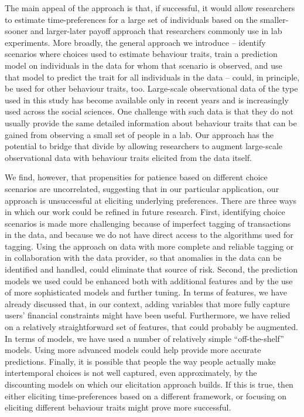 The main appeal of the approach is that, if successful, it would allow
researchers to estimate time-preferences for a large set of individuals based
on the smaller-sooner and larger-later payoff approach that researchers
commonly use in lab experiments. More broadly, the general approach we
introduce -- identify scenarios where choices used to estimate behaviour
traits, train a prediction model on individuals in the data for whom that
scenario is observed, and use that model to predict the trait for all
individuals in the data -- could, in principle, be used for other behaviour
traits, too. Large-scale observational data of the type used in this study has
become available only in recent years and is increasingly used across the
social sciences. One challenge with such data is that they do not usually
provide the same detailed information about behaviour traits that can be gained
from observing a small set of people in a lab. Our approach has the potential
to bridge that divide by allowing researchers to augment large-scale
observational data with behaviour traits elicited from the data itself.

We find, however, that propensities for patience based on different choice
scenarios are uncorrelated, suggesting that in our particular application, our
approach is unsuccessful at eliciting underlying preferences. There are three
ways in which our work could be refined in future research. First, identifying
choice scenarios is made more challenging because of imperfect tagging of
transactions in the data, and because we do not have direct access to the
algorithms used for tagging. Using the approach on data with more complete and
reliable tagging or in collaboration with the data provider, so that anomalies
in the data can be identified and handled, could eliminate that source of risk.
Second, the prediction models we used could be enhanced both with additional
features and by the use of more sophisticated models and further tuning. In
terms of features, we have already discussed that, in our context, adding
variables that more fully capture users' financial constraints might have been
useful. Furthermore, we have relied on a relatively straightforward set of
features, that could probably be augmented. In terms of models, we have used a
number of relatively simple ``off-the-shelf'' models. Using more advanced
models could help provide more accurate predictions. Finally, it is possible
that people the way people actually make intertemporal choices is not well
captured, even approximately, by the discounting models on which our
elicitation approach builds. If this is true, then either eliciting
time-preferences based on a different framework, or focusing on eliciting
different behaviour traits might prove more successful.

